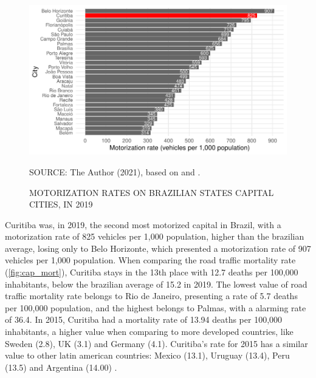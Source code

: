 \begin{figure}[!htbp]
    \centering\footnotesize
    \captionsetup{font=footnotesize}
    \caption{MOTORIZATION RATES ON BRAZILIAN STATES CAPITAL CITIES, IN 2019}
    \includegraphics{fig/cap_motor.pdf}
    \label{fig:cap_motor}
    \par SOURCE: The Author (2021), based on \textcite{MinistryofHealth2021} and \textcite{DENATRAN2020}.
\end{figure}   

Curitiba was, in 2019, the second most motorized capital in Brazil, with a motorization rate of 825 vehicles per 1,000 population, higher than the brazilian average, losing only to Belo Horizonte, which presented a motorization rate of 907 vehicles per 1,000 population. When comparing the road traffic mortality rate (\autoref{fig:cap_mort}), Curitiba stays in the 13th place with 12.7 deaths per 100,000 inhabitants, below the brazilian average of 15.2 in 2019. The lowest value of road traffic mortality rate belongs to Rio de Janeiro, presenting a rate of 5.7 deaths per 100,000 population, and the highest belongs to Palmas, with a alarming rate of 36.4. In 2015, Curitiba had a mortality rate of 13.94 deaths per 100,000 inhabitants, a higher value when comparing to more developed countries, like Sweden (2.8), UK (3.1) and Germany (4.1). Curitiba's rate for 2015 has a similar value to other latin american countries: Mexico (13.1), Uruguay (13.4), Peru (13.5) and Argentina (14.00) \cite{WHO2018}. 

